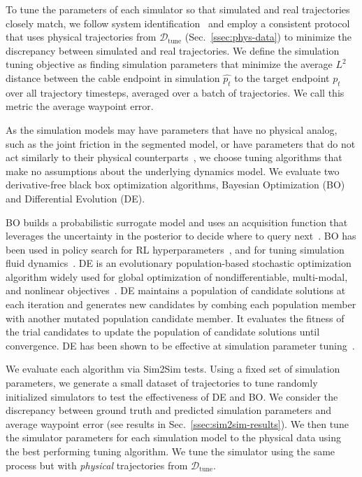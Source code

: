 \documentclass[letterpaper, 10pt, conference]{ieeeconf}  %
\newcommand{\dtune}{\mathcal{D}_\textrm{tune}}
\newcommand{\remark}[3]{{\color{#2}[#1: #3]}}
\newcommand{\Vincent}[1]{\remark{Vincent}{purple}{#1}}
\begin{document}
To tune the parameters of each simulator so that simulated and real trajectories closely match, we follow system identification~\cite{sys_id} and employ a consistent protocol that uses physical trajectories from $\dtune$ (Sec.~\ref{ssec:phys-data}) to minimize the discrepancy between simulated and real trajectories. We define the simulation tuning objective as finding simulation parameters that minimize the average $L^2$ distance between the cable endpoint in simulation $\hat{p_t}$ to the target endpoint $p_t$ over all trajectory timesteps, averaged over a batch of trajectories. We call this metric the average waypoint error. 

As the simulation models may have parameters that have no physical analog, such as the joint friction in the segmented model, or have parameters that do not act similarly to their physical counterparts~\cite{9340852}, we choose tuning algorithms that make no assumptions about the underlying dynamics model. We evaluate two derivative-free black box optimization algorithms, Bayesian Optimization (BO) and Differential Evolution (DE). %

BO builds a probabilistic surrogate model and uses an acquisition function that leverages the uncertainty in the posterior to decide where to query next~\cite{frazier2018tutorial}. BO has been used in policy search for RL hyperparameters~\cite{shahriari2015taking,lizotte2007automatic}, and for tuning simulation fluid dynamics~\cite{9340852}.
DE is an evolutionary population-based stochastic optimization algorithm widely used for global optimization of nondifferentiable, multi-modal, and nonlinear objectives~\cite{storn1997differential}. DE maintains a population of candidate solutions at each iteration and generates new candidates by combing each population member with another mutated population candidate member. It evaluates the fitness of the trial candidates to update the population of candidate solutions until convergence. DE has been shown to be effective at simulation parameter tuning~\cite{de_tuning_2020}.

We evaluate each algorithm via Sim2Sim tests. Using a fixed set of simulation parameters, we generate a small dataset of trajectories to tune randomly initialized simulators to test the effectiveness of DE and BO. We consider the discrepancy between ground truth and predicted simulation parameters and average waypoint error (see results in Sec.~\ref{ssec:sim2sim-results}). We then tune the simulator parameters for each simulation model to the physical data using the best performing tuning algorithm. We tune the simulator using the same process but with \emph{physical} trajectories from $\dtune$. 
\end{document}
